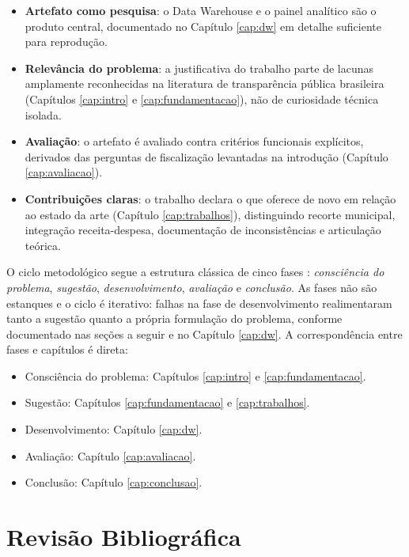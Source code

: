 \begin{itemize}
    \item \textbf{Artefato como pesquisa}: o Data Warehouse e o painel
    analítico são o produto central, documentado no Capítulo
    \ref{cap:dw} em detalhe suficiente para reprodução.

    \item \textbf{Relevância do problema}: a justificativa do trabalho
    parte de lacunas amplamente reconhecidas na literatura de
    transparência pública brasileira (Capítulos \ref{cap:intro} e
    \ref{cap:fundamentacao}), não de curiosidade técnica isolada.

    \item \textbf{Avaliação}: o artefato é avaliado contra
    critérios funcionais explícitos, derivados das perguntas de
    fiscalização levantadas na introdução (Capítulo \ref{cap:avaliacao}).

    \item \textbf{Contribuições claras}: o trabalho declara o que oferece
    de novo em relação ao estado da arte (Capítulo \ref{cap:trabalhos}),
    distinguindo recorte municipal, integração receita-despesa,
    documentação de inconsistências e articulação teórica.
\end{itemize}

O ciclo metodológico segue a estrutura clássica de cinco fases
\cite{dresch2015}: \emph{consciência do problema}, \emph{sugestão},
\emph{desenvolvimento}, \emph{avaliação} e \emph{conclusão}. As fases
não são estanques e o ciclo é iterativo: falhas na fase de
desenvolvimento realimentaram tanto a sugestão quanto a própria
formulação do problema, conforme documentado nas seções a seguir e no
Capítulo \ref{cap:dw}. A correspondência entre fases e capítulos é
direta:

\begin{itemize}
    \item Consciência do problema: Capítulos \ref{cap:intro} e
    \ref{cap:fundamentacao}.
    \item Sugestão: Capítulos \ref{cap:fundamentacao} e
    \ref{cap:trabalhos}.
    \item Desenvolvimento: Capítulo \ref{cap:dw}.
    \item Avaliação: Capítulo \ref{cap:avaliacao}.
    \item Conclusão: Capítulo \ref{cap:conclusao}.
\end{itemize}

\section{Revisão Bibliográfica}
\label{sec:revisao}

